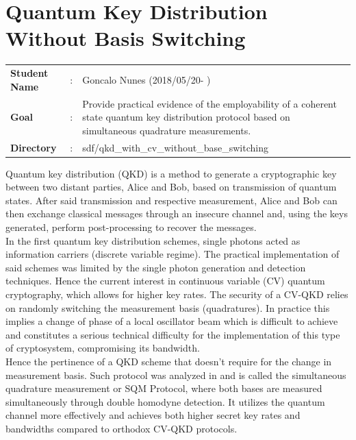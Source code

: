 \clearpage
\section{Quantum Key Distribution Without Basis Switching}

\begin{refsection}

\begin{tcolorbox}	
\begin{tabular}{p{2.75cm} p{0.2cm} p{10.5cm}} 	
\textbf{Student Name}  &:&  Goncalo Nunes (2018/05/20- )\\
\textbf{Goal}          &:& Provide practical evidence of the employability of a coherent state quantum key distribution protocol based on simultaneous quadrature measurements.\\
\textbf{Directory}              &:& sdf/qkd\_with\_cv\_without\_base\_switching
\end{tabular}
\end{tcolorbox}Quantum key distribution (QKD) is a method to generate a cryptographic key between two distant parties, Alice and Bob, based on transmission of quantum states. After said transmission and respective measurement, Alice and Bob can then exchange classical messages through an insecure channel and, using the keys generated, perform post-processing to recover the messages.\\ 
In the first quantum key distribution schemes, single photons acted as information carriers (discrete variable regime). The practical implementation of said schemes was limited by the single photon generation and detection techniques. Hence the current interest in continuous variable (CV) quantum cryptography, which allows for higher key rates. The security of a CV-QKD relies on randomly switching the measurement basis (quadratures). In practice this implies a change of phase of a local oscillator beam which is difficult to achieve and constitutes a serious technical difficulty for the implementation of this type of cryptosystem, compromising its bandwidth.\\
Hence the pertinence of a QKD scheme that doesn't require for the change in measurement basis. Such protocol was analyzed in \cite{Weedbrook2004} and is called the simultaneous quadrature measurement or SQM Protocol, where both bases are measured simultaneously through double homodyne detection. It utilizes the quantum channel more effectively and achieves both higher secret key rates and bandwidths compared to orthodox CV-QKD protocols.

\end{refsection}
